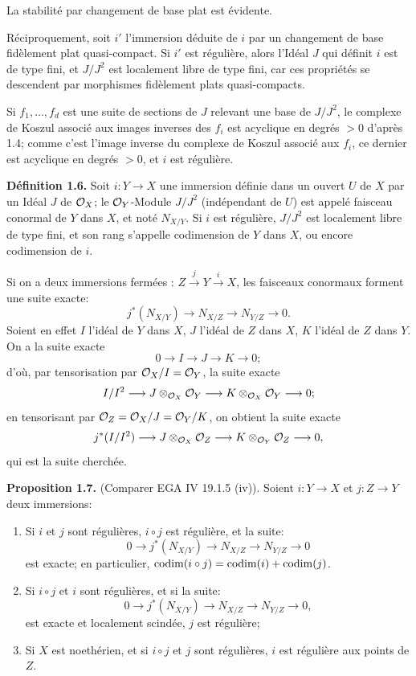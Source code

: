 La stabilité par changement de base plat est évidente.

Réciproquement, soit $i'$ l'immersion déduite de $i$ par un changement de
base fidèlement plat quasi-compact. Si $i'$ est régulière, alors l'Idéal $J$ qui définit $i$ est de type fini, et $J/J^2$ est localement libre de type fini, car ces propriétés se descendent par morphismes fidèlement plats quasi-compacts.

Si $f_1,\ldots,f_d$ est une suite de sections de $J$ relevant une base de $J/J^2$, le complexe de Koszul associé aux images inverses des $f_i$ est acyclique en degrés $>0$ d'après 1.4; comme c'est l'image inverse du complexe de Koszul associé aux $f_i$, ce dernier est acyclique en degrés $>0$, et $i$ est régulière.

\textbf{Définition 1.6.} Soit $i:Y\longrightarrow X$ une immersion définie dans un ouvert $U$ de $X$ par un Idéal $J$ de $\mathcal O_X$; le $\mathcal O_Y$-Module $J/J^2$ (indépendant de $U$) est appelé faisceau conormal de $Y$ dans $X$, et noté $N_{X/Y}$. Si $i$ est régulière, $J/J^2$ est localement libre de type fini, et son rang s'appelle codimension de $Y$ dans $X$, ou encore codimension de $i$.

Si on a deux immersions fermées : $Z\xrightarrow{j}Y\xrightarrow{i}X$, les faisceaux conormaux forment une suite exacte:
\begin{equation}\tag{1.6.1}
 j^*(N_{X/Y})\longrightarrow N_{X/Z}\longrightarrow N_{Y/Z}\longrightarrow0.
\end{equation}
Soient en effet $I$ l'idéal de $Y$ dans $X$, $J$ l'idéal de $Z$ dans $X$, $K$ l'idéal de $Z$ dans $Y$. On a la suite exacte
\[
0\longrightarrow I\longrightarrow J\longrightarrow K\longrightarrow0;
\]
d'où, par tensorisation par $\mathcal O_X/I=\mathcal O_Y$, la suite exacte
\[
 I/I^2\longrightarrow J\otimes_{\mathcal O_X}\mathcal O_Y\longrightarrow K\otimes_{\mathcal O_X}\mathcal O_Y\longrightarrow0;
\]
en tensorisant par $\mathcal O_Z=\mathcal O_X/J=\mathcal O_Y/K$, on obtient la suite exacte
\[
 j^*(I/I^2)\longrightarrow J\otimes_{\mathcal O_X}\mathcal O_Z\longrightarrow K\otimes_{\mathcal O_Y}\mathcal O_Z\longrightarrow0,
\]
qui est la suite cherchée.

\textbf{Proposition 1.7.} (Comparer EGA IV 19.1.5 (iv)). Soient $i:Y\longrightarrow X$ et $j:Z\longrightarrow Y$ deux immersions:
\begin{enumerate}[label=\roman*)]
\item Si $i$ et $j$ sont régulières, $i\circ j$ est régulière, et la suite:
\[
0\longrightarrow j^*(N_{X/Y})\longrightarrow N_{X/Z}\longrightarrow N_{Y/Z}\longrightarrow0
\]
est exacte; en particulier, $\operatorname{codim}(i\circ j)=\operatorname{codim}(i)+\operatorname{codim}(j)$.
\item Si $i\circ j$ et $i$ sont régulières, et si la suite:
\[
0\longrightarrow j^*(N_{X/Y})\longrightarrow N_{X/Z}\longrightarrow N_{Y/Z}\longrightarrow0,
\]
est exacte et localement scindée, $j$ est régulière;
\item Si $X$ est noethérien, et si $i\circ j$ et $j$ sont régulières, $i$ est régulière aux points de $Z$.
\end{enumerate}


